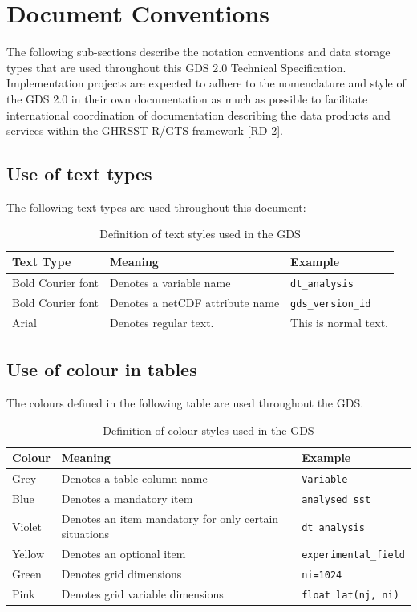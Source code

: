 \pagebreak
\section{Document Conventions}
The following sub-sections describe the notation conventions and data storage types that are used
throughout this GDS 2.0 Technical Specification. Implementation projects are expected to adhere to
the nomenclature and style of the GDS 2.0 in their own documentation as much as possible to
facilitate international coordination of documentation describing the data products and services within
the GHRSST R/GTS framework [RD-2].
\subsection{Use of text types}
The following text types are used throughout this document:
\begin{table}[h]
\centering
\caption{Definition of text styles used in the GDS}
\label{tab:table-label}
\begin{tabular}{|p{2.5cm}|>{\raggedright}p{5.5cm}|p{3cm}|}
\hline \rowcolor{lightgray}
\textbf{Text Type} & \textbf{Meaning} & \textbf{Example} \\
\hline
Bold Courier font & Denotes a variable name & \texttt{dt\_analysis} \\
\hline
Bold Courier font & Denotes a netCDF attribute name & \texttt{gds\_version\_id} \\
\hline
Arial & Denotes regular text. & This is normal text. \\
\hline
\end{tabular}
\end{table}
\subsection{Use of colour in tables}
The colours defined in the following table are used throughout the GDS.
\begin{table}[h]
\centering
\caption{Definition of colour styles used in the GDS}
\label{tab:color-styles}
\begin{tabular}{|l|l|l|}
\hline
\rowcolor{lightgray} \textbf{ Colour} & \textbf{Meaning} & \textbf{Example}\\
\hline
Grey & Denotes a table column name & \cellcolor{lightgray} \texttt{Variable}\\
\hline
Blue & Denotes a mandatory item & \cellcolor{cyan} \texttt{analysed\_sst}\\
\hline
Violet & Denotes an item mandatory for only certain situations & \cellcolor{Thistle} \texttt{dt\_analysis}\\
\hline
Yellow & Denotes an optional item & \cellcolor{Goldenrod} \texttt{experimental\_field}\\
\hline
Green & Denotes grid dimensions & \cellcolor{YellowGreen} \texttt{ni=1024}\\
\hline
Pink & Denotes grid variable dimensions & \cellcolor{Apricot} \texttt{float lat(nj, ni)}\\
\hline
\end{tabular}
\end{table}

